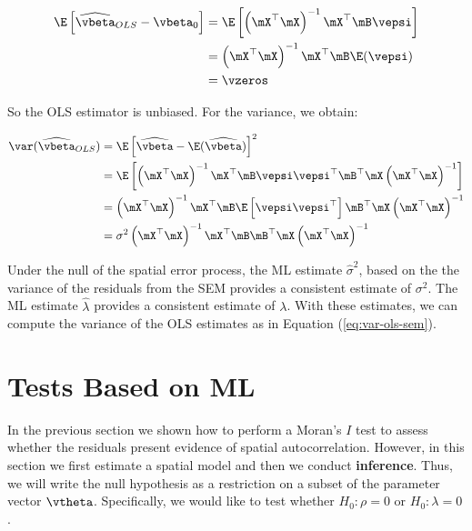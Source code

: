 \documentclass[english,12pt]{book}\usepackage[]{graphicx}\usepackage[]{xcolor}
\begin{document}
    \begin{equation*}
      \begin{aligned}
      \E\left[\widehat{\vbeta}_{OLS} -\vbeta_0\right] & = \E\left[\left(\mX^\top\mX\right)^{-1}\mX^\top\mB\vepsi \right] \\
                                                & = \left(\mX^\top\mX\right)^{-1}\mX^\top\mB\E(\vepsi) \\
                                                & = \vzeros
      \end{aligned}
    \end{equation*}
    
    So the OLS estimator is unbiased. For the variance, we obtain:
    
    \begin{equation}\label{eq:var-ols-sem}
      \begin{aligned}
        \var(\widehat{\vbeta}_{OLS}) & = \E\left[\widehat{\vbeta}-\E(\widehat{\vbeta})\right]^2 \\
                               & = \E\left[\left(\mX^\top\mX\right)^{-1}\mX^\top\mB\vepsi\vepsi^\top\mB^\top\mX\left(\mX^\top\mX\right)^{-1}\right] \\
                               & = \left(\mX^\top\mX\right)^{-1}\mX^\top\mB\E\left[\vepsi\vepsi^\top\right]\mB^\top\mX\left(\mX^\top\mX\right)^{-1} \\
                               & = \sigma^2\left(\mX^\top\mX\right)^{-1}\mX^\top\mB\mB^\top\mX\left(\mX^\top\mX\right)^{-1}
      \end{aligned}
    \end{equation}
    
    Under the null of the spatial error process, the ML estimate $\widehat{\sigma}^2$, based on the the variance of the residuals from the SEM provides a consistent estimate of $\sigma^2$. The ML estimate $\widehat{\lambda}$ provides a consistent estimate of $\lambda$. With these estimates, we can compute the variance of the OLS estimates as in Equation (\ref{eq:var-ols-sem})\citep{pace2008spatial}.


\section{Tests Based on ML}

In the previous section we shown how to perform a Moran's $I$ test to assess whether the residuals present evidence of spatial autocorrelation. However, in this section we first estimate a spatial model and then we conduct \textbf{inference}. Thus, we will write the null hypothesis as a restriction on a subset of the parameter vector $\vtheta$. Specifically, we would like to test whether $H_0: \rho = 0$ or $H_0: \lambda = 0$.
\end{document}
